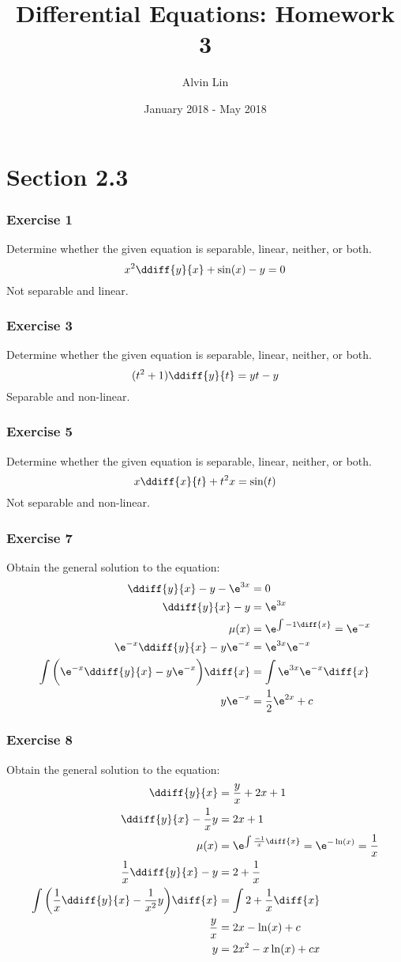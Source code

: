 \documentclass{math}
\title{Differential Equations: Homework 3}
\author{Alvin Lin}
\date{January 2018 - May 2018}
\begin{document}
\maketitle
\clearpage

\section*{Section 2.3}

\subsubsection*{Exercise 1}
Determine whether the given equation is separable, linear, neither, or both.
\[ x^2\ddiff{y}{x}+\sin(x)-y = 0 \]
Not separable and linear.

\subsubsection*{Exercise 3}
Determine whether the given equation is separable, linear, neither, or both.
\[ (t^2+1)\ddiff{y}{t} = yt-y \]
Separable and non-linear.

\subsubsection*{Exercise 5}
Determine whether the given equation is separable, linear, neither, or both.
\[ x\ddiff{x}{t}+t^2x = \sin(t) \]
Not separable and non-linear.

\subsubsection*{Exercise 7}
Obtain the general solution to the equation:
\begin{align*}
  \ddiff{y}{x}-y-\e^{3x} &= 0 \\
  \ddiff{y}{x}-y &= \e^{3x} \\
  \mu(x) &= \e^{\int-1\diff{x}} = \e^{-x} \\
  \e^{-x}\ddiff{y}{x}-y\e^{-x} &= \e^{3x}\e^{-x} \\
  \int\bigg(\e^{-x}\ddiff{y}{x}-y\e^{-x}\bigg)\diff{x} &=
    \int\e^{3x}\e^{-x}\diff{x} \\
  y\e^{-x} &= \frac{1}{2}\e^{2x}+c
\end{align*}

\subsubsection*{Exercise 8}
Obtain the general solution to the equation:
\begin{align*}
  \ddiff{y}{x} &= \frac{y}{x}+2x+1 \\
  \ddiff{y}{x}-\frac{1}{x}y &= 2x+1 \\
  \mu(x) &= \e^{\int\frac{-1}{x}\diff{x}} = \e^{-\ln(x)} = \frac{1}{x} \\
  \frac{1}{x}\ddiff{y}{x}-y &= 2+\frac{1}{x} \\
  \int\bigg(\frac{1}{x}\ddiff{y}{x}-\frac{1}{x^2}y\bigg)\diff{x} &=
    \int2+\frac{1}{x}\diff{x} \\
  \frac{y}{x} &= 2x-\ln(x)+c \\
  y &= 2x^2-x\ln(x)+cx
\end{align*}
\end{document}
